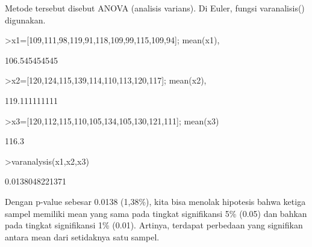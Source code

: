 \documentclass{article}
\begin{document}
\begin{eulernotebook}
\begin{eulercomment}
\begin{eulercomment}
\begin{eulercomment}
\begin{eulercomment}
\begin{eulercomment}
Metode tersebut disebut ANOVA (analisis varians). Di Euler, fungsi
varanalisis() digunakan.
\end{eulercomment}
\begin{eulerprompt}
>x1=[109,111,98,119,91,118,109,99,115,109,94]; mean(x1),
\end{eulerprompt}
\begin{euleroutput}
  106.545454545
\end{euleroutput}
\begin{eulerprompt}
>x2=[120,124,115,139,114,110,113,120,117]; mean(x2),
\end{eulerprompt}
\begin{euleroutput}
  119.111111111
\end{euleroutput}
\begin{eulerprompt}
>x3=[120,112,115,110,105,134,105,130,121,111]; mean(x3)
\end{eulerprompt}
\begin{euleroutput}
  116.3
\end{euleroutput}
\begin{eulerprompt}
>varanalysis(x1,x2,x3)
\end{eulerprompt}
\begin{euleroutput}
  0.0138048221371
\end{euleroutput}
\begin{eulercomment}
Dengan p-value sebesar 0.0138 (1,38\%), kita bisa menolak hipotesis
bahwa ketiga sampel memiliki mean yang sama pada tingkat signifikansi
5\% (0.05) dan bahkan pada tingkat signifikansi 1\% (0.01). Artinya,
terdapat perbedaan yang signifikan antara mean dari setidaknya satu
sampel.


\end{eulercomment}
\end{eulercomment}
\end{eulercomment}
\end{eulercomment}
\end{eulercomment}
\end{eulernotebook}
\end{document}
